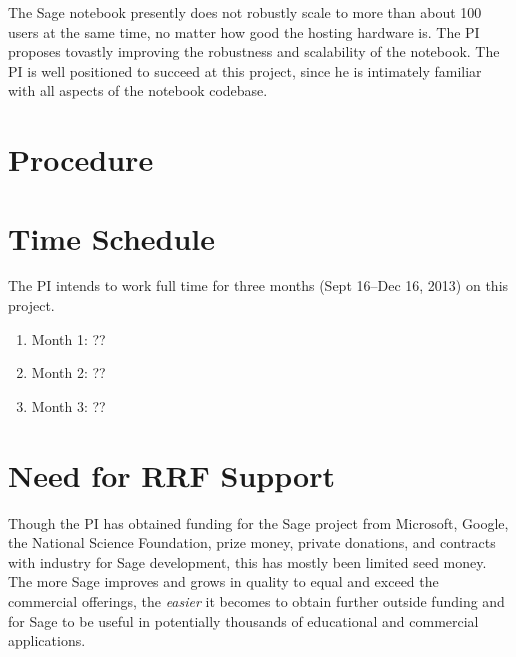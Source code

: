 \documentclass[11pt]{article}
\begin{document}
The Sage notebook presently does not robustly scale to more than about
100 users at the same time, no matter how good the hosting hardware
is.  The PI proposes tovastly improving the robustness and scalability
of the notebook.  The PI is well positioned to succeed at this
project, since he is intimately familiar with all aspects of the
notebook codebase.


\section{Procedure}



\section{Time Schedule}

The PI intends to work full time for three months (Sept 16--Dec 16, 2013) on this project.

\begin{enumerate}
\item Month 1: ??
\item Month 2: ??
\item Month 3: ??
\end{enumerate}


\section{Need for RRF Support}

Though the PI has obtained funding for the Sage project from
Microsoft, Google, the National Science Foundation, prize money,
private donations, and contracts with industry for Sage development,
this has mostly been limited seed money.  The more Sage improves and
grows in quality to equal and exceed the commercial offerings, the
{\em easier} it becomes to obtain further outside funding and for Sage
to be useful in potentially thousands of educational and commercial
applications.
\end{document}
